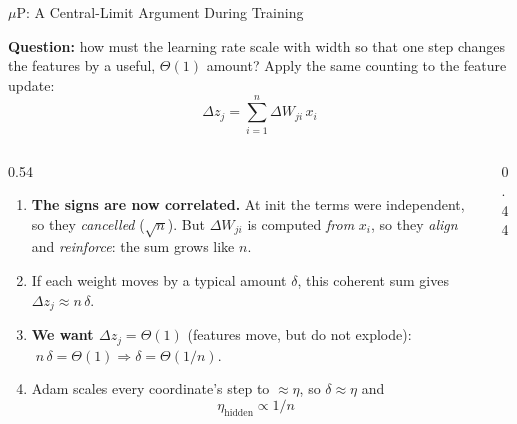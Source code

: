 \begin{frame}{$\mu$P: A Central-Limit Argument During Training}

  \textbf{Question:} how must the learning rate scale with width so that one step changes the features by a useful, $\Theta(1)$ amount? Apply the same counting to the feature update:
  \[
    \Delta z_j = \sum_{i=1}^{n} \Delta W_{ji}\, x_i
  \]

  \begin{columns}[T]
    \begin{column}{0.54\textwidth}
      \begin{enumerate}
        \item \textbf{The signs are now correlated.} At init the terms were independent, so they \emph{cancelled} ($\sqrt n$). But $\Delta W_{ji}$ is computed \emph{from} $x_i$, so they \emph{align} and \emph{reinforce}: the sum grows like $n$.
        \item If each weight moves by a typical amount $\delta$, this coherent sum gives $\Delta z_j \approx n\,\delta$.
        \item \textbf{We want $\Delta z_j = \Theta(1)$} (features move, but do not explode): $\;n\,\delta = \Theta(1) \Rightarrow \delta = \Theta(1/n)$.
        \item Adam scales every coordinate's step to $\approx \eta$, so $\delta \approx \eta$ and
        \[
          \boxed{\ \eta_{\text{hidden}} \propto 1/n\ }
        \]
      \end{enumerate}
    \end{column}
    \begin{column}{0.44\textwidth}
      \begin{center}
\end{center}
\end{column}
\end{columns}
\end{frame}
